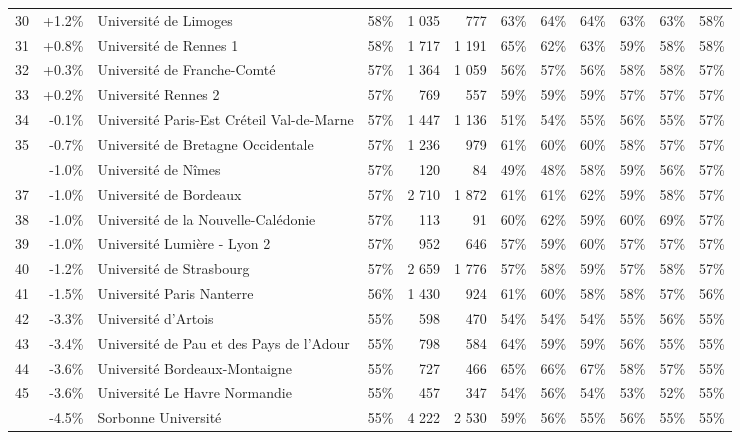 \documentclass[11pt,french,landscape]{article}
\begin{document}
\begin{longtable}{rrlrrrrrrlrr}
30 & +1.2\% & Université de Limoges & 58\% & 1 035 & 777 & 63\% & 64\% & 64\% & 63\% & 63\% & 58\%\\
\addlinespace
\rowcolor{gray!6}  31 & +0.8\% & Université de Rennes 1 & 58\% & 1 717 & 1 191 & 65\% & 62\% & 63\% & 59\% & 58\% & 58\%\\
32 & +0.3\% & Université de Franche-Comté & 57\% & 1 364 & 1 059 & 56\% & 57\% & 56\% & 58\% & 58\% & 57\%\\
\rowcolor{gray!6}  33 & +0.2\% & Université Rennes 2 & 57\% & 769 & 557 & 59\% & 59\% & 59\% & 57\% & 57\% & 57\%\\
34 & -0.1\% & Université Paris-Est Créteil Val-de-Marne & 57\% & 1 447 & 1 136 & 51\% & 54\% & 55\% & 56\% & 55\% & 57\%\\
\rowcolor{gray!6}  35 & -0.7\% & Université de Bretagne Occidentale & 57\% & 1 236 & 979 & 61\% & 60\% & 60\% & 58\% & 57\% & 57\%\\
\addlinespace
36 & -1.0\% & Université de Nîmes & 57\% & 120 & 84 & 49\% & 48\% & 58\% & 59\% & 56\% & 57\%\\
\rowcolor{gray!6}  37 & -1.0\% & Université de Bordeaux & 57\% & 2 710 & 1 872 & 61\% & 61\% & 62\% & 59\% & 58\% & 57\%\\
38 & -1.0\% & Université de la Nouvelle-Calédonie & 57\% & 113 & 91 & 60\% & 62\% & 59\% & 60\% & 69\% & 57\%\\
\rowcolor{gray!6}  39 & -1.0\% & Université Lumière - Lyon 2 & 57\% & 952 & 646 & 57\% & 59\% & 60\% & 57\% & 57\% & 57\%\\
40 & -1.2\% & Université de Strasbourg & 57\% & 2 659 & 1 776 & 57\% & 58\% & 59\% & 57\% & 58\% & 57\%\\
\addlinespace
\rowcolor{gray!6}  41 & -1.5\% & Université Paris Nanterre & 56\% & 1 430 & 924 & 61\% & 60\% & 58\% & 58\% & 57\% & 56\%\\
42 & -3.3\% & Université d'Artois & 55\% & 598 & 470 & 54\% & 54\% & 54\% & 55\% & 56\% & 55\%\\
\rowcolor{gray!6}  43 & -3.4\% & Université de Pau et des Pays de l'Adour & 55\% & 798 & 584 & 64\% & 59\% & 59\% & 56\% & 55\% & 55\%\\
44 & -3.6\% & Université Bordeaux-Montaigne & 55\% & 727 & 466 & 65\% & 66\% & 67\% & 58\% & 57\% & 55\%\\
\rowcolor{gray!6}  45 & -3.6\% & Université Le Havre Normandie & 55\% & 457 & 347 & 54\% & 56\% & 54\% & 53\% & 52\% & 55\%\\
\addlinespace
46 & -4.5\% & Sorbonne Université & 55\% & 4 222 & 2 530 & 59\% & 56\% & 55\% & 56\% & 55\% & 55\%\\

\end{longtable}
\end{document}
